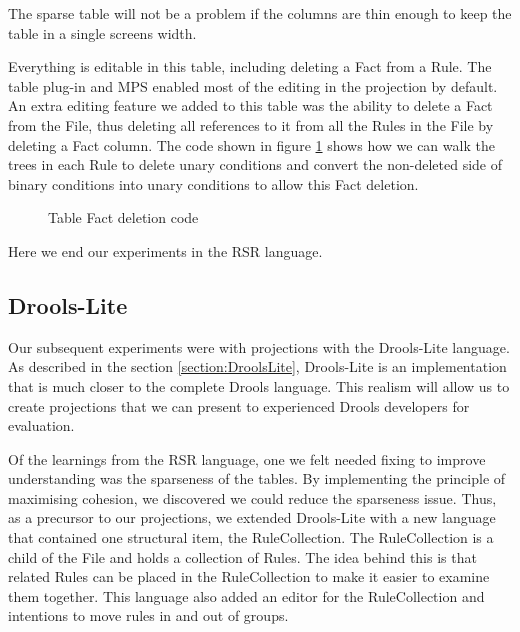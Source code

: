 The sparse table will not be a problem if the columns are thin enough to keep the table in a single screens width.

Everything is editable in this table, including deleting a Fact from a Rule.
The table plug-in and MPS enabled most of the editing in the projection by default.
An extra editing feature we added to this table was the ability to delete a Fact from the File, thus deleting all references to it from all the Rules in the File by deleting a Fact column.
The code shown in figure \ref{fig:tableFactDeletion} shows how we can walk the trees in each Rule to delete unary conditions and convert the non-deleted side of binary conditions into unary conditions to allow this Fact deletion.

\begin{figure}[h]
    \centering
    \caption{Table Fact deletion code}
    \label{fig:tableFactDeletion}
\end{figure}

Here we end our experiments in the RSR language.

\subsection{Drools-Lite}

Our subsequent experiments were with projections with the Drools-Lite language.
As described in the section \ref{section:DroolsLite}, Drools-Lite is an implementation that is much closer to the complete Drools language.
This realism will allow us to create projections that we can present to experienced Drools developers for evaluation.

Of the learnings from the RSR language, one we felt needed fixing to improve understanding was the sparseness of the tables.
By implementing the principle of maximising cohesion, we discovered we could reduce the sparseness issue.
Thus, as a precursor to our projections, we extended Drools-Lite with a new language that contained one structural item, the RuleCollection.
The RuleCollection is a child of the  File and holds a collection of Rules.
The idea behind this is that related Rules can be placed in the RuleCollection to make it easier to examine them together.
This language also added an editor for the RuleCollection and intentions to move rules in and out of groups.

